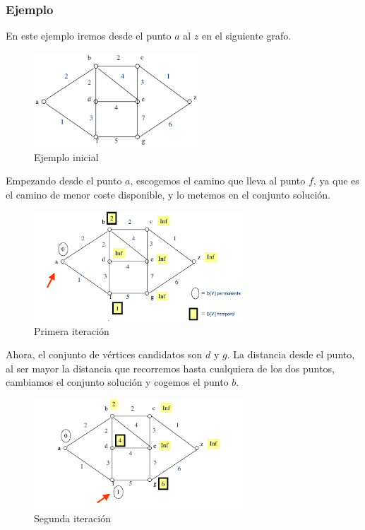 \documentclass[10pt,a4paper,spanish]{report}
\theoremstyle{definition}
\theoremstyle{remark}
\begin{document}
\newpage

\subsubsection{\textcolor{electriccrimson}Ejemplo}

En este ejemplo iremos desde el punto $a$ al $z$ en el siguiente grafo.

\begin{center}

\begin{figure}[!h]
\centering
\includegraphics[width=0.55\textwidth]{d1}
\caption{Ejemplo inicial}
\end{figure}

Empezando desde el punto $a$, escogemos el camino que lleva al punto $f$, ya que es el camino de menor coste disponible, y lo metemos en el conjunto solución.

\begin{figure}[!h]
\centering
\includegraphics[width=0.7\textwidth]{d2}
\caption{Primera iteración}
\end{figure}

Ahora, el conjunto de vértices candidatos son $d$ y $g$. La distancia desde el punto, al ser mayor la distancia que recorremos hasta cualquiera de los dos puntos, cambiamos el conjunto solución y cogemos el punto $b$.

\begin{figure}[!h]
\centering
\includegraphics[width=0.7\textwidth]{d3}
\caption{Segunda iteración}
\end{figure}


\end{center}
\end{document}
